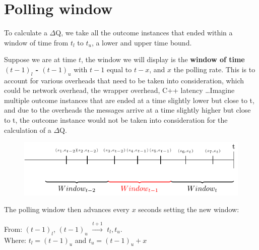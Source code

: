 \section{Polling window}
    To calculate a $\Delta$Q, we take all the outcome instances that ended within a window of time from $t_l$ to $t_u$, a lower and upper time bound.
    
    Suppose we are at time $t$, the window we will display is the  \textbf{window of time $(t-1)_{l}$ - $(t-1)_u$} with $t-1$ equal to $t - x$, and $x$ the polling rate. This is to account for various overheads that need to be taken into consideration, which could be network overhead, the wrapper overhead, C++ latency \dots Imagine multiple outcome instances that are ended at a time slightly lower but close to t, and due to the overheads the messages arrive at a time slightly higher but close to t, the outcome instance would not be taken into consideration for the calculation of a $\Delta$Q.
    
    \begin{figure}[H]
        \begin{center}
            \includegraphics{tikz/window.pdf}
        \end{center}
    \end{figure}

    The polling window then advances every $x$ seconds setting the new window: 
    \begin{center}
        From: $(t-1)_l$, $(t-1)_u$ $\xrightarrow{t + 1}$ $t_l, t_u$. \\
        Where: $t_l = (t-1)_u$ and $t_u = (t-1)_u + x$ 
    \end{center}

